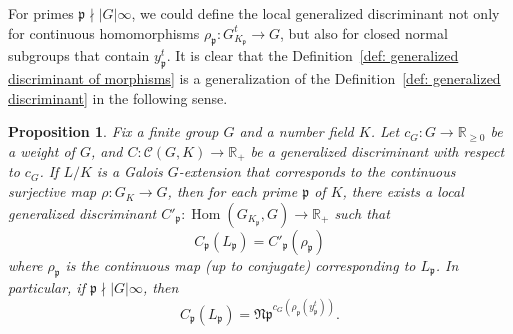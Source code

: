 \documentclass[12pt,a4paper]{amsart}
\numberwithin{equation}{section}%
\theoremstyle{plain}%
\newtheorem{proposition}[theorem]{Proposition}%
\theoremstyle{definition}%
\theoremstyle{remark}%
\begin{document}
	For primes $\mathfrak{p}\nmid\lvert G\rvert\infty$, we could define the local generalized discriminant not only for continuous homomorphisms $\rho_{\mathfrak{p}}:G_{K_{\mathfrak{p}}}^t\to G$, but also for closed normal subgroups that contain $y_{\mathfrak{p}}^t$.
	It is clear that the Definition~\ref{def: generalized discriminant of morphisms} is a generalization of the Definition~\ref{def: generalized discriminant} in the following sense.
	\begin{proposition}\label{prop: generalized discriminant of morphisms}
		Fix a finite group $G$ and a number field $K$.
		Let $c_{G}:G\to\mathbb{R}_{\geq0}$ be a weight of $G$, and $C:\mathcal{C}(G,K)\to\mathbb{R}_{+}$ be a generalized discriminant with respect to $c_{G}$.
		If $L/K$ is a Galois $G$-extension that corresponds to the continuous surjective map $\rho:G_K\to G$, then for each prime $\mathfrak{p}$ of $K$, there exists a local generalized discriminant $C'_{\mathfrak{p}}:\operatorname{Hom}(G_{K_{\mathfrak{p}}},G)\to\mathbb{R}_{+}$ such that
		\begin{equation*}
			C_{\mathfrak{p}}(L_{\mathfrak{p}})=C'_{\mathfrak{p}}(\rho_{\mathfrak{p}})
		\end{equation*}
		where $\rho_{\mathfrak{p}}$ is the continuous map (up to conjugate) corresponding to $L_{\mathfrak{p}}$.
		In particular, if $\mathfrak{p}\nmid\lvert G\rvert\infty$, then
		\begin{equation*}
			C_{\mathfrak{p}}(L_{\mathfrak{p}})=\mathfrak{Np}^{c_{G}(\rho_{\mathfrak{p}}(y^{t}_{\mathfrak{p}}))}.
		\end{equation*}
	\end{proposition}
\end{document}
